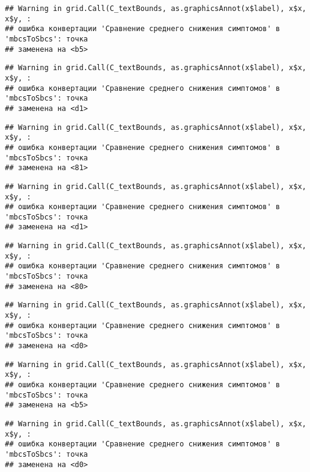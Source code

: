 \documentclass[
]{article}
\begin{document}
\begin{verbatim}
## Warning in grid.Call(C_textBounds, as.graphicsAnnot(x$label), x$x, x$y, :
## ошибка конвертации 'Сравнение среднего снижения симптомов' в 'mbcsToSbcs': точка
## заменена на <b5>
\end{verbatim}

\begin{verbatim}
## Warning in grid.Call(C_textBounds, as.graphicsAnnot(x$label), x$x, x$y, :
## ошибка конвертации 'Сравнение среднего снижения симптомов' в 'mbcsToSbcs': точка
## заменена на <d1>
\end{verbatim}

\begin{verbatim}
## Warning in grid.Call(C_textBounds, as.graphicsAnnot(x$label), x$x, x$y, :
## ошибка конвертации 'Сравнение среднего снижения симптомов' в 'mbcsToSbcs': точка
## заменена на <81>
\end{verbatim}

\begin{verbatim}
## Warning in grid.Call(C_textBounds, as.graphicsAnnot(x$label), x$x, x$y, :
## ошибка конвертации 'Сравнение среднего снижения симптомов' в 'mbcsToSbcs': точка
## заменена на <d1>
\end{verbatim}

\begin{verbatim}
## Warning in grid.Call(C_textBounds, as.graphicsAnnot(x$label), x$x, x$y, :
## ошибка конвертации 'Сравнение среднего снижения симптомов' в 'mbcsToSbcs': точка
## заменена на <80>
\end{verbatim}

\begin{verbatim}
## Warning in grid.Call(C_textBounds, as.graphicsAnnot(x$label), x$x, x$y, :
## ошибка конвертации 'Сравнение среднего снижения симптомов' в 'mbcsToSbcs': точка
## заменена на <d0>
\end{verbatim}

\begin{verbatim}
## Warning in grid.Call(C_textBounds, as.graphicsAnnot(x$label), x$x, x$y, :
## ошибка конвертации 'Сравнение среднего снижения симптомов' в 'mbcsToSbcs': точка
## заменена на <b5>
\end{verbatim}

\begin{verbatim}
## Warning in grid.Call(C_textBounds, as.graphicsAnnot(x$label), x$x, x$y, :
## ошибка конвертации 'Сравнение среднего снижения симптомов' в 'mbcsToSbcs': точка
## заменена на <d0>
\end{verbatim}
\end{document}
